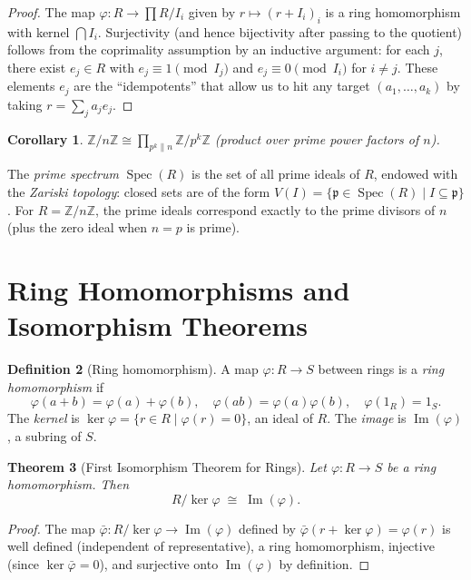 \documentclass[12pt,a4paper]{amsart}
\newtheorem{theorem}{Theorem}[section]
\newtheorem{corollary}[theorem]{Corollary}
\theoremstyle{definition}
\newtheorem{definition}[theorem]{Definition}
\theoremstyle{definition}
\DeclareMathOperator{\Spec}{Spec}
\begin{document}
\begin{proof}
The map $\varphi\colon R \to \prod R/I_i$ given by $r \mapsto (r + I_i)_i$ is a
ring homomorphism with kernel $\bigcap I_i$.
Surjectivity (and hence bijectivity after passing to the quotient) follows from the
coprimality assumption by an inductive argument: for each $j$, there exist $e_j \in R$
with $e_j \equiv 1 \pmod{I_j}$ and $e_j \equiv 0 \pmod{I_i}$ for $i \neq j$.
These elements $e_j$ are the ``idempotents'' that allow us to hit any target
$(a_1,\ldots,a_k)$ by taking $r = \sum_j a_j e_j$.
\end{proof}

\begin{corollary}
$\mathbb{Z}/n\mathbb{Z} \cong \prod_{p^k \| n} \mathbb{Z}/p^k\mathbb{Z}$
(product over prime power factors of $n$).
\end{corollary}

The \emph{prime spectrum} $\Spec(R)$ is the set of all prime ideals of $R$,
endowed with the \emph{Zariski topology}: closed sets are of the form
$V(I) = \{\mathfrak{p} \in \Spec(R) \mid I \subseteq \mathfrak{p}\}$.
For $R = \mathbb{Z}/n\mathbb{Z}$, the prime ideals correspond exactly to the
prime divisors of $n$ (plus the zero ideal when $n = p$ is prime).

\section{Ring Homomorphisms and Isomorphism Theorems}

\begin{definition}[Ring homomorphism]
A map $\varphi\colon R \to S$ between rings is a \emph{ring homomorphism} if
\[
  \varphi(a+b) = \varphi(a) + \varphi(b),\quad
  \varphi(ab) = \varphi(a)\varphi(b),\quad
  \varphi(1_R) = 1_S.
\]
The \emph{kernel} is $\ker\varphi = \{r \in R \mid \varphi(r) = 0\}$, an ideal of $R$.
The \emph{image} is $\operatorname{Im}(\varphi)$, a subring of $S$.
\end{definition}

\begin{theorem}[First Isomorphism Theorem for Rings]
Let $\varphi\colon R \to S$ be a ring homomorphism. Then
\[
  R/\ker\varphi \;\cong\; \operatorname{Im}(\varphi).
\]
\end{theorem}

\begin{proof}
The map $\bar\varphi\colon R/\ker\varphi \to \operatorname{Im}(\varphi)$ defined by
$\bar\varphi(r + \ker\varphi) = \varphi(r)$ is well defined (independent of
representative), a ring homomorphism, injective (since $\ker\bar\varphi = 0$),
and surjective onto $\operatorname{Im}(\varphi)$ by definition.
\end{proof}
\end{document}
